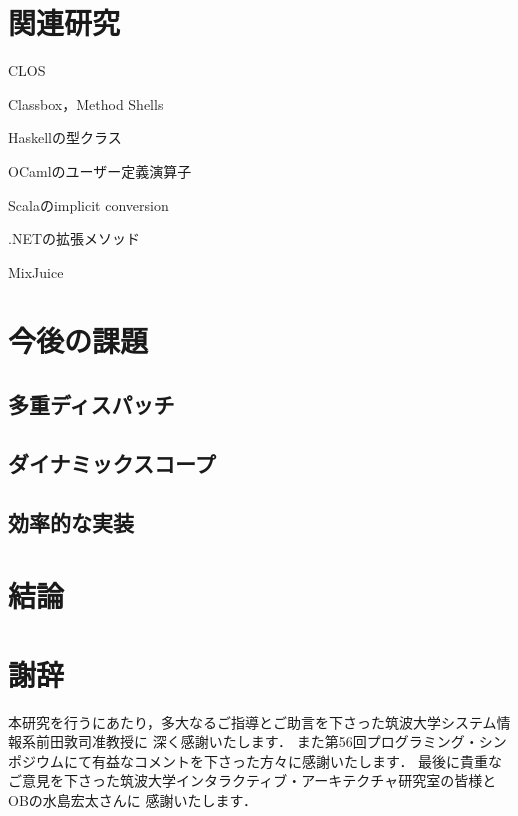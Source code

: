 \documentclass[a4paper,11pt,dvipdfmx]{jreport}
\begin{document}
\chapter{関連研究}
\label{chapter:related-work}

CLOS

Classbox，Method Shells

Haskellの型クラス

OCamlのユーザー定義演算子

Scalaのimplicit conversion

.NETの拡張メソッド

MixJuice


\chapter{今後の課題}
\label{chapter:future-work}

\section{多重ディスパッチ}

\section{ダイナミックスコープ}

\section{効率的な実装}


\chapter{結論}
\label{chapter:conclusion}


\chapter*{謝辞}

本研究を行うにあたり，多大なるご指導とご助言を下さった筑波大学システム情報系前田敦司准教授に
深く感謝いたします．
また第56回プログラミング・シンポジウムにて有益なコメントを下さった方々に感謝いたします．
最後に貴重なご意見を下さった筑波大学インタラクティブ・アーキテクチャ研究室の皆様とOBの水島宏太さんに
感謝いたします．

\newpage

\renewcommand{\bibname}{参考文献}
\end{document}
